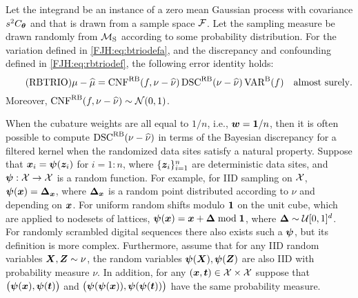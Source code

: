 \documentclass[graybox,footinfo]{svmult}
\begin{document}
\begin{theorem}  \label{FJH:thm:rbtrio} Let 
the integrand be 
	an instance of a zero mean Gaussian process with covariance $s^2C_{{\boldsymbol{\theta}}}$ and 
	that is drawn from a sample space ${\mathcal{F}}$.  Let the sampling measure be drawn 
	randomly from ${\mathcal{M}}_{\textup{S}}$ according to some probability distribution.  For 
	the  
	variation defined in \eqref{FJH:eq:btriodefa}, and the discrepancy and 
	confounding defined in \eqref{FJH:eq:rbtriodef}, the following error identity holds: 
	\begin{equation} \tag{RBTRIO} \label{FJH:eq:rbtrio}
	\mu - \hmu  = \algn^{\Rn\Ba}(f,\nu - \hnu) \, \disc^{\Rn\Ba}(\nu - \hnu) \, \Var^{\Ba}(f) 
	\quad 
	\text{almost surely}.
	\end{equation}
	Moreover, $\textup{CNF}^{\textup{R}\textup{B}}(f,\nu - \widehat{\nu}) \sim {\mathcal{N}}(0,1)$. 
\end{theorem}

\begin{FJHLesson}
	\FJHLessonSix
\end{FJHLesson}

When the cubature weights are all equal to $1/n$, i.e., ${\boldsymbol{w}} = {\boldsymbol{1}}/n$, then it is 
often possible to compute 
$\textup{DSC}^{\textup{R}\textup{B}}(\nu - \widehat{\nu})$ in terms of the Bayesian discrepancy for a filtered kernel 
when the randomized data sites satisfy a natural 
property.  Suppose that ${\boldsymbol{x}}_i ={\boldsymbol{\psi}} ({\boldsymbol{z}}_i)$ for $i = 1 \!:\!n$, where 
$\{{\boldsymbol{z}}_i\}_{i=1}^n$ are deterministic data sites, and ${\boldsymbol{\psi}} :{\mathcal{X}} \to {\mathcal{X}}$ is a random 
function.  For example, for IID sampling on ${\mathcal{X}}$, ${\boldsymbol{\psi}}({\boldsymbol{x}}) = {\boldsymbol{\Delta}}_{\boldsymbol{x}}$, 
where 
${\boldsymbol{\Delta}}_{\boldsymbol{x}}$ is a random point distributed according to $\nu$ and depending on 
${\boldsymbol{x}}$.  For uniform random shifts modulo ${\boldsymbol{1}}$ on the unit cube, 
which are applied to nodesets of lattices, ${\boldsymbol{\psi}}({\boldsymbol{x}}) = {\boldsymbol{x}} + {\boldsymbol{\Delta}} \bmod {\boldsymbol{1}}$, 
where ${\boldsymbol{\Delta}} \sim {\mathcal{U}}[0,1]^d$.  For randomly scrambled digital sequences there 
also 
exists such a ${\boldsymbol{\psi}}$, but its definition is more complex.  Furthermore, assume that for 
any IID random variables ${\boldsymbol{X}}, {\boldsymbol{Z}} \sim \nu$,  the random variables ${\boldsymbol{\psi}}({\boldsymbol{X}}), 
{\boldsymbol{\psi}}({\boldsymbol{Z}})$ are also IID with probability measure $\nu$.  In addition, for any $({\boldsymbol{x}}, 
{\boldsymbol{t}}) \in {\mathcal{X}} \times {\mathcal{X}}$ suppose that  $\bigl({\boldsymbol{\psi}}({\boldsymbol{x}}), {\boldsymbol{\psi}}({\boldsymbol{t}}) \bigr)$ and 
$\bigl({\boldsymbol{\psi}}({\boldsymbol{\psi}}({\boldsymbol{x}})), {\boldsymbol{\psi}}({\boldsymbol{\psi}}({\boldsymbol{t}})) \bigr)$ have the same probability measure.
\end{document}
